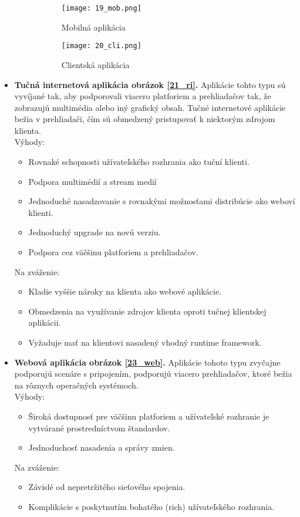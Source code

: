 \begin{itemize}
\begin{figure}[h]
\centering
\begin{subfigure}{0.5\linewidth}
\texttt{[image: 19\_mob.png]}
\caption{Mobilná aplikácia \cite{IOT03}}
\label{19_mob}
\end{subfigure}%
\begin{subfigure}{0.5\linewidth}
\texttt{[image: 20\_cli.png]}
\caption{Clientská aplikácia \cite{IOT03}}
\label{20_cli}
\end{subfigure}
\caption{}
\end{figure}

 
\item
 \textbf{Tučná internetová aplikácia obrázok \ref{21_ri}.} Aplikácie tohto typu sú vyvíjané tak, aby podporovali viacero platforiem a prehliadačov tak, že zobrazujú multimédia alebo iný grafický obsah. Tučné internetové aplikácie bežia v prehliadači, čím sú obmedzený pristupovať k niektorým zdrojom klienta. \\
Výhody: 
 \begin{itemize}
   \item  Rovnaké schopnosti užívateľského rozhrania ako tuční klienti.
   \item  Podpora multimédií a stream medií
   \item  Jednoduché nasadzovanie  s rovnakými možnosťami distribúcie ako weboví klienti. 
   \item Jednoduchý upgrade na novú verziu.
   \item Podpora cez väčšinu platforiem a prehliadačov. 
 \end{itemize}
Na zváženie: 
 \begin{itemize}
   \item Kladie vyššie nároky na klienta ako webové aplikácie.
   \item Obmedzenia na využívanie zdrojov klienta oproti tučnej klientskej aplikácii. 
   \item Vyžaduje mať na klientovi nasadený vhodný runtime framework.
 \end{itemize} 
 
  \item
  \textbf{Webová aplikácia obrázok \ref{23_web}.} Aplikácie tohoto typu zvyčajne podporujú scenáre s pripojením, podporujú viacero prehliadačov, ktoré bežia na rôznych operačných systémoch.\\
Výhody: 
 \begin{itemize}
   \item Široká dostupnosť pre väčšinu platforiem a užívateľské rozhranie je vytvárané prostredníctvom štandardov.
   \item Jednoduchosť nasadenia a správy zmien.
 \end{itemize}
Na zváženie: 
 \begin{itemize}
   \item Závislé od nepretržitého sieťového spojenia.
   \item Komplikácie s poskytnutím bohatého (rich) užívateľského rozhrania.
 \end{itemize}  
 

\end{itemize}
